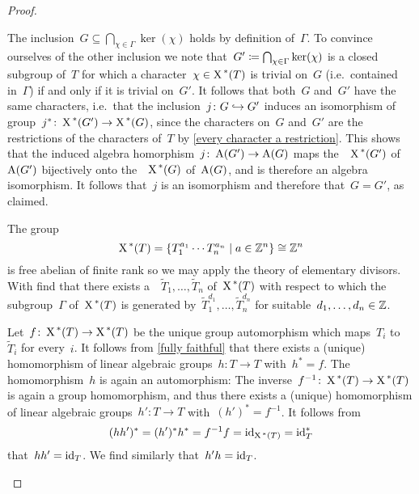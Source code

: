 \begin{proof}
\begin{enumerate}[label = Step~\arabic*]
      The inclusion~$G \subseteq  \bigcap_{\chi \in \Gamma} \ker(\chi)$ holds by definition of~$\Gamma$.
      To convince ourselves of the other inclusion we note that~$G' \coloneqq \bigcap_{\chi \in \Gamma} \ker(\chi)$ is a closed subgroup of~$T$ for which a character~$\chi \in \operatorname{X}^{\,*}(T)$ is trivial on~$G$ (i.e.\ contained in~$\Gamma$) if and only if it is trivial on~$G'$.
      It follows that both~$G$ and~$G'$ have the same characters, i.e.\ that the inclusion~$j \colon G \hookrightarrow G'$ induces an isomorphism of group~$j^* \colon \operatorname{X}^{\,*}(G') \to \operatorname{X}^{\,*}(G)$, since the characters on~$G$ and~$G'$ are the restrictions of the characters of~$T$ by \ref{every character a restriction}.
      This shows that the induced algebra homorphism~$j \colon \operatorname{A}(G') \to \operatorname{A}(G)$ maps the~~$\operatorname{X}^{\,*}(G')$ of~$\operatorname{A}(G')$ bijectively onto the~~$\operatorname{X}^{\,*}(G)$ of~$\operatorname{A}(G)$, and is therefore an algebra isomorphism.
      It follows that~$j$ is an isomorphism and therefore that~$G = G'$, as claimed.
      
      The group
      \[
                \chargroup(T)
        =       \left\{
                  T_1^{a_1} \dotsm T_n^{a_n}
                \suchthat
                  \mindex{a} \in \Integer^n
                \right\}
         \cong  \Integer^n
      \]
      is free abelian of finite rank so we may apply the theory of elementary divisors.
      With find that there exists a~~$\tilde{T}_1, \dotsc, \tilde{T}_n$ of~$\operatorname{X}^{\,*}(T)$ with respect to which the subgroup~$\Gamma$ of~$\operatorname{X}^{\,*}(T)$ is generated by~$\tilde{T}_1^{d_1}, \dotsc, \tilde{T}_n^{d_n}$ for suitable~$d_1, \dotsc, d_n \in \mathbb{Z}$.
      
      Let~$f \colon \operatorname{X}^{\,*}(T) \to \operatorname{X}^{\,*}(T)$ be the unique group automorphism which maps~$T_i$ to~$\tilde{T}_i$ for every~$i$.
      It follows from \ref{fully faithful} that there exists a (unique) homomorphism of linear algebraic groups~$h \colon T \to T$ with~$h^* = f$.
      The homomorphism~$h$ is again an automorphism:
      The inverse~$f^{-1} \colon \operatorname{X}^{\,*}(T) \to \operatorname{X}^{\,*}(T)$ is again a group homomorphism, and thus there exists a (unique) homomorphism of linear algebraic groups~$h' \colon T \to T$ with~$(h')^* = f^{-1}$.
      It follows from
      \[
          (h h')^*
        = (h')^* h^*
        = f^{-1} f
        = \operatorname{id}_{\operatorname{X}^{\,*}(T)}
        = \operatorname{id}_T^*
      \]
      that~$h h' = \operatorname{id}_T$.
      We find similarly that~$h' h = \operatorname{id}_T$.
      

\end{enumerate}
\end{proof}
